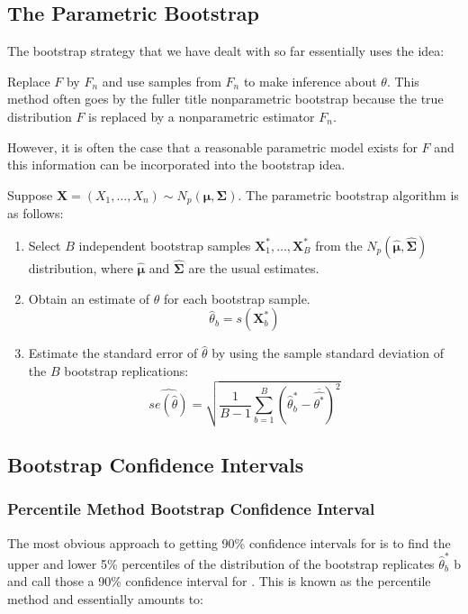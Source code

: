 \documentclass[12pt]{article}
\numberwithin{equation}{section}
\begin{document}
\subsection{The Parametric Bootstrap}
The bootstrap strategy that we have dealt with so far essentially uses the idea:


Replace $F$ by $F_n$ and use samples from $F_n$ to make inference about $\theta$. This method often goes by the fuller title nonparametric bootstrap because
the true distribution $F$ is replaced by a nonparametric estimator $F_n$.

However, it is often the case that a reasonable parametric model exists for $F$ and this information can be incorporated into the bootstrap idea.

Suppose $\bm{X} = (X_1, \ldots, X_n) \sim N_p(\bm{\mu}, \bm{\Sigma})$. The parametric bootstrap algorithm is as follows:
\begin{enumerate}
  \item Select $B$ independent bootstrap samples 
  $\bm{X}_1^*, \ldots, \bm{X}_B^*$ from the
  $N_p(\bm{\hat{\mu}}, \bm{\widehat{\Sigma}})$ distribution, where $\hat{\bm{\mu}}$ and $\hat{\bm{\Sigma}}$ are the usual estimates.
  \item Obtain an estimate of $\theta$ for each bootstrap sample.
  \begin{equation*}
    \hat{\theta}_b = s(\bm{X}_b^*)
  \end{equation*}
  \item Estimate the standard error of $\hat{\theta}$ by using the sample standard deviation of the $B$ bootstrap replications:
  \begin{equation*}
    \widehat{se(\hat{\theta})} = \sqrt{ \frac{1}{B-1}
      \sum_{b = 1}^B \left( \hat{\theta}_b^* - \overline{\widehat{\theta^*}} \right) ^2
    }
  \end{equation*}
\end{enumerate}



\newpage
\subsection{Bootstrap Confidence Intervals}
\subsubsection{Percentile Method Bootstrap Confidence Interval}
The most obvious approach to getting 90\% confidence intervals for  is to
find the upper and lower 5\% percentiles of the distribution of the bootstrap
replicates $\hat{\theta}_b^*$
b and call those a 90\% confidence interval for . This is known
as the percentile method and essentially amounts to:
\end{document}
